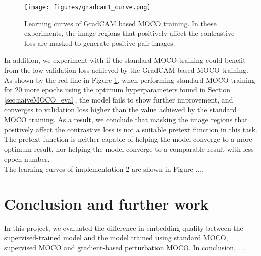 \documentclass[12pt,twoside]{report}
\begin{document}
\begin{figure}
    \centering
    \texttt{[image: figures/gradcam1\_curve.png]}
    \caption{Learning curves of GradCAM based MOCO training. In these experiments, the image regions that positively affect the contrastive loss are masked to generate positive pair images. }
    \label{fig:gradcam1_curve}
\end{figure}

In addition, we experiment with if the standard MOCO training could benefit from the low validation loss achieved by the GradCAM-based MOCO training. As shown by the red line in Figure \ref{fig:gradcam1_curve}, when performing standard MOCO training for 20 more epochs using the optimum hyperparameters found in Section \ref{sec:naiveMOCO_eval}, the model fails to show further improvement, and converges to validation loss higher than the value achieved by the standard MOCO training. As a result, we conclude that masking the image regions that positively affect the contrastive loss is not a suitable pretext function in this task. The pretext function is neither capable of helping the model converge to a more optimum result, nor helping the model converge to a comparable result with less epoch number. \\

The learning curves of implementation 2 are shown in Figure .... 


\chapter{Conclusion and further work}

In this project, we evaluated the difference in embedding quality between the supervised-trained model and the model trained using standard MOCO, supervised MOCO and gradient-based perturbation MOCO. In conclusion, .... \\
\end{document}
